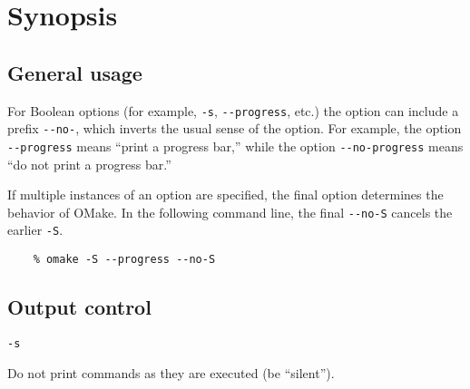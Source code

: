 %
\chapter{Synopsis}
\label{chapter:options}

     

%
\section{General usage}

For Boolean options (for example, \verb+-s+, \verb+--progress+, etc.) the option can include a
prefix \verb+--no-+, which inverts the usual sense of the option.  For example, the option
\verb+--progress+ means ``print a progress bar,''  while the option \verb+--no-progress+ means
``do not print a progress bar.''

If multiple instances of an option are specified, the final option determines the behavior of OMake.
In the following command line, the final \verb+--no-S+ cancels the earlier \verb+-S+.

\begin{verbatim}
    % omake -S --progress --no-S
\end{verbatim}

\section{Output control}

 \verb+-s+

Do not print commands as they are executed (be ``silent'').

